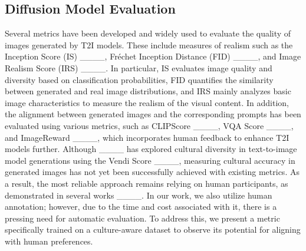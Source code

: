 \subsection{Diffusion Model Evaluation}
Several metrics have been developed and widely used to evaluate the quality of images generated by T2I models. These include measures of realism such as the Inception Score (IS) ____, Fréchet Inception Distance (FID) ____, and Image Realism Score (IRS) ____. In particular, IS evaluates image quality and diversity based on classification probabilities, FID quantifies the similarity between generated and real image distributions, and IRS mainly analyzes basic image characteristics to measure the realism of the visual content.
In addition, the alignment between generated images and the corresponding prompts has been evaluated using various metrics, such as CLIPScore ____, VQA Score ____, and ImageReward ____, which incorporates human feedback to enhance T2I models further. Although ____ has explored cultural diversity in text-to-image model generations using the Vendi Score ____, measuring cultural accuracy in generated images has not yet been successfully achieved with existing metrics. As a result, the most reliable approach remains relying on human participants, as demonstrated in several works ____. In our work, we also utilize human annotation; however, due to the time and cost associated with it, there is a pressing need for automatic evaluation. To address this, we present a metric specifically trained on a culture-aware dataset to observe its potential for aligning with human preferences.